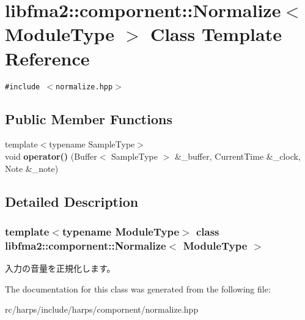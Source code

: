 \section{libfma2::compornent::Normalize$<$ ModuleType $>$ Class Template Reference}
\label{classlibfma2_1_1compornent_1_1Normalize}
{\tt \#include $<$normalize.hpp$>$}

\subsection*{Public Member Functions}
\begin{CompactItemize}
\item 
{\footnotesize template$<$typename SampleType$>$ }\\void \textbf{operator()} (Buffer$<$ SampleType $>$ \&\_\-buffer, CurrentTime \&\_\-clock, Note \&\_\-note)\label{classlibfma2_1_1compornent_1_1Normalize_c278dffefdffa31889a316004d35e0a0}

\end{CompactItemize}


\subsection{Detailed Description}
\subsubsection*{template$<$typename ModuleType$>$ class libfma2::compornent::Normalize$<$ ModuleType $>$}

入力の音量を正規化します。 

The documentation for this class was generated from the following file:\begin{CompactItemize}
\item 
rc/harps/include/harps/compornent/normalize.hpp\end{CompactItemize}
